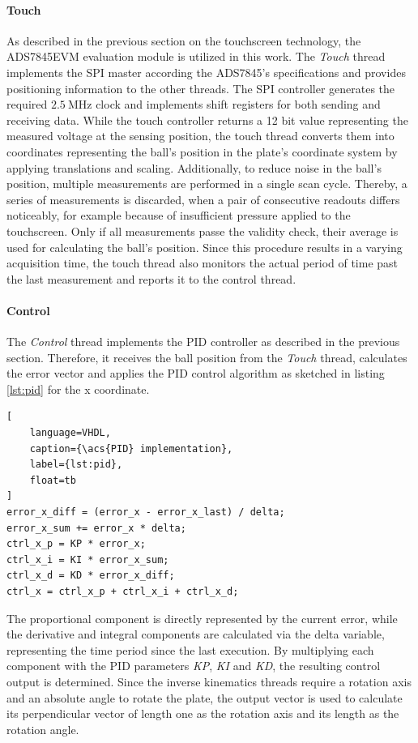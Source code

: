 \paragraph{Touch} As described in the previous section on the touchscreen
technology, the ADS7845EVM evaluation module is utilized in this work. The
\emph{Touch} thread implements the \ac{SPI} master according the ADS7845's
specifications and provides positioning information to the other threads. The
\ac{SPI} controller generates the required $\SI{2.5}{\mega\hertz}$ clock and
implements shift registers for both sending and receiving data. While the
touch controller returns a 12 bit value representing the measured voltage at
the sensing position, the touch thread converts them into coordinates
representing the ball's position in the plate's coordinate system by applying
translations and scaling. Additionally, to reduce noise in the ball's
position, multiple measurements are performed in a single scan cycle. Thereby,
a series of measurements is discarded, when a pair of consecutive readouts
differs noticeably, for example because of insufficient pressure applied to
the touchscreen. Only if all measurements passe the validity check, their
average is used for calculating the ball's position. Since this procedure
results in a varying acquisition time, the touch thread also monitors the
actual period of time past the last measurement and reports it to the control
thread.

\paragraph{Control} The \emph{Control} thread implements the \ac{PID}
controller as described in the previous section. Therefore, it receives the
ball position from the \emph{Touch} thread, calculates the error vector and
applies the \ac{PID} control algorithm as sketched in listing \ref{lst:pid}
for the x coordinate.
\begin{lstlisting}[
	language=VHDL,
	caption={\acs{PID} implementation},
	label={lst:pid},
	float=tb
]
error_x_diff = (error_x - error_x_last) / delta;
error_x_sum += error_x * delta;
ctrl_x_p = KP * error_x;
ctrl_x_i = KI * error_x_sum;
ctrl_x_d = KD * error_x_diff;
ctrl_x = ctrl_x_p + ctrl_x_i + ctrl_x_d;
\end{lstlisting}
The proportional component is directly represented by the current error, while
the derivative and integral components are calculated via the delta variable,
representing the time period since the last execution. By multiplying each
component with the \ac{PID} parameters \emph{KP}, \emph{KI} and \emph{KD}, the
resulting control output is determined. Since the inverse kinematics threads
require a rotation axis and an absolute angle to rotate the plate, the output
vector is used to calculate its perpendicular vector of length one as the
rotation axis and its length as the rotation angle.


